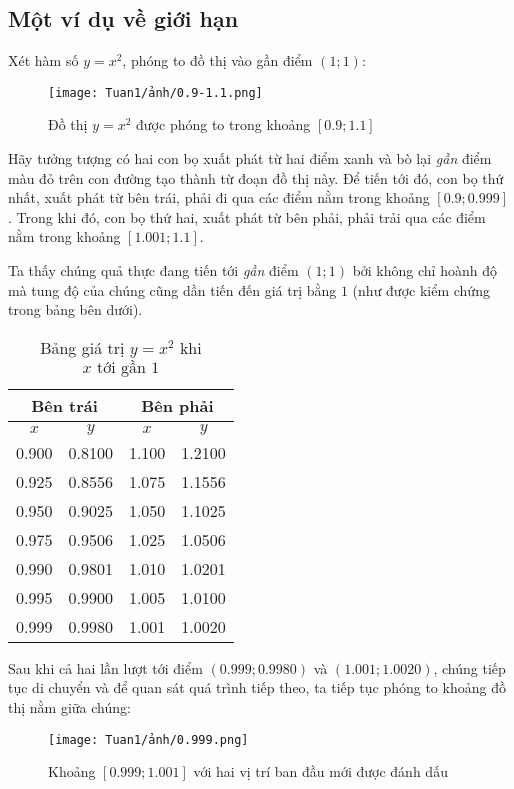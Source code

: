\subsection{Một ví dụ về giới hạn}
Xét hàm số $y=x^2$, phóng to đồ thị vào gần điểm $(1;1)$:
\begin{figure}[h!]
    \centering
    \texttt{[image: Tuan1/ảnh/0.9-1.1.png]}
    \caption{Đồ thị \(y=x^2\) được phóng to trong khoảng $[0.9;1.1]$}
    \label{anh3}
\end{figure}

Hãy tưởng tượng có hai con bọ xuất phát từ hai điểm xanh và bò lại \emph{gần} điểm màu đỏ trên con đường tạo thành từ đoạn đồ thị này. Để tiến tới đó, con bọ thứ nhất, xuất phát từ bên trái, phải đi qua các điểm nằm trong khoảng $[0.9;0.999]$. Trong khi đó, con bọ thứ hai, xuất phát từ bên phải, phải trải qua các điểm nằm trong khoảng $[1.001;1.1]$.

Ta thấy chúng quả thực đang tiến tới \emph{gần} điểm $(1;1)$ bởi không chỉ hoành độ mà tung độ của chúng cũng dần tiến đến giá trị bằng $1$ (như được kiểm chứng trong bảng bên dưới).
\begin{table}[H]
    \centering
    \caption{Bảng giá trị \( y = x^2 \) khi \( x \text{~tới gần } 1 \)}
    \begin{tabular}{|c|c||c|c|}
    \hline
    \multicolumn{2}{|c||}{Bên trái} & \multicolumn{2}{c|}{Bên phải} \\
    \hline
    \( x \) & \( y \) & \( x \) & \( y \) \\
    \hline
    0.900 & 0.8100 & 1.100 & 1.2100 \\
    0.925 & 0.8556 & 1.075 & 1.1556 \\
    0.950 & 0.9025 & 1.050 & 1.1025 \\
    0.975 & 0.9506 & 1.025 & 1.0506 \\
    0.990 & 0.9801 & 1.010 & 1.0201 \\
    0.995 & 0.9900 & 1.005 & 1.0100 \\
    0.999 & 0.9980 & 1.001 & 1.0020 \\
    \hline
    \end{tabular}
\end{table}
   
Sau khi cả hai lần lượt tới điểm $(0.999;0.9980)$ và $(1.001;1.0020)$, chúng tiếp tục di chuyển và để quan sát quá trình tiếp theo, ta tiếp tục phóng to khoảng đồ thị nằm giữa chúng:
\begin{figure}[h!]
    \centering
    \texttt{[image: Tuan1/ảnh/0.999.png]}
    \caption{Khoảng \([0.999;1.001]\) với hai vị trí ban đầu mới được đánh dấu }
\end{figure}

